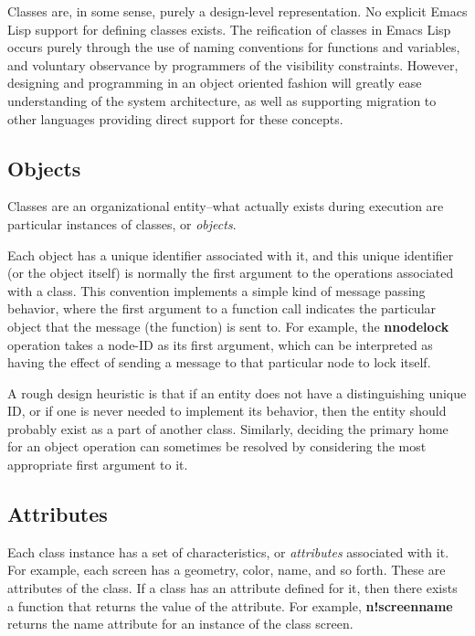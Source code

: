 Classes are, in some sense, purely a design-level representation. No
explicit Emacs Lisp support for defining classes exists.  The
reification of classes in Emacs Lisp occurs purely through the use of
naming conventions for functions and variables, and voluntary
observance by programmers of the visibility constraints.  However, designing and 
programming
in an object oriented fashion will greatly ease understanding of the system architecture,
as well as supporting migration to other languages providing direct support
for these concepts.

\subsection{Objects} 

Classes are an organizational entity--what actually exists during
execution are particular instances of classes, or {\em objects}.

Each object has a unique identifier associated with it, and this
unique identifier (or the object itself) is normally the first
argument to the operations associated with a class.  This convention
implements a simple kind of message passing behavior, where the first
argument to a function call indicates the particular object that the
message (the function) is sent to.  For example, the {\bf
n\STAR node\STAR lock} operation takes a node-ID as its first argument, which
can be interpreted as having the effect of sending a message to that
particular node to lock itself.

A rough design heuristic is that if an entity does not have a
distinguishing unique ID, or if one is never needed to implement its
behavior, then the entity should probably exist as a part of another
class.  Similarly, deciding the primary home for an object operation
can sometimes be resolved by considering the most appropriate first
argument to it.

\subsection{Attributes}  

Each class instance has a set of characteristics, or {\em
attributes}\/ associated with it.  For example, each screen has a
geometry, color, name, and so forth.  These are attributes of the
class.  If a class has an attribute defined for it, then there exists
a function that returns the value of the attribute.  For example, {\bf
n!screen\STAR name} returns the {\sf name} attribute for an instance of the
class {\sf screen}.

